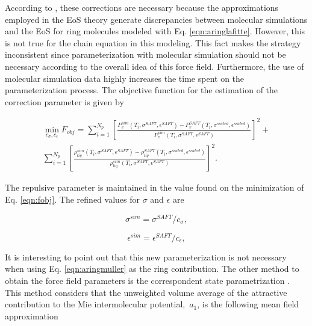 	According to , these corrections are necessary because the approximations employed in the EoS theory generate discrepancies between molecular simulations and the EoS for ring molecules modeled with Eq. \eqref{eqn:aringlafitte}. However, this is not true for the chain equation in this modeling. This fact makes the strategy inconsistent since parameterization with molecular simulation should not be necessary according to the overall idea of this force field. Furthermore, the use of molecular simulation data highly increases the time spent on the parameterization process. The objective function for the estimation of the correction parameter is given by
	
	\begin{equation}
	\begin{split}
	\min\limits_{c_{\sigma},c_{\epsilon}} F_{obj}= \sum_{i=1}^{N_{p}} \left[\frac{P_{v}^{sim}(T_{i},\sigma^{SAFT},\epsilon^{SAFT})-P_{v}^{SAFT}(T_{i},\sigma^{scaled},\epsilon^{scaled})}{P_{v}^{sim}(T_{i},\sigma^{SAFT},\epsilon^{SAFT})} \right]^2 + \\
	\sum_{i=1}^{N_{p}} \left[\frac{\rho_{liq}^{sim}(T_{i},\sigma^{SAFT},\epsilon^{SAFT})-\rho_{liq}^{SAFT}(T_{i},\sigma^{scaled},\epsilon^{scaled})}{\rho_{liq}^{sim}(T_{i},\sigma^{SAFT},\epsilon^{SAFT})} \right]^2 .
	\end{split}
	\label{eqn:fobjla}
	\end{equation}
	
	The repulsive parameter is maintained in the value found on the minimization of Eq. \eqref{eqn:fobj}. The refined values for $\sigma$ and $\epsilon$ are
	
	\begin{equation}
	\sigma^{sim} = \sigma^{SAFT}/c_{\sigma},
	\label{eqn:simsigma}
	\end{equation}
	
	\begin{equation}
	\epsilon^{sim} = \epsilon^{SAFT}/c_{\epsilon},
	\label{eqn:simeps}
	\end{equation}
	
	It is interesting to point out that this new parameterization is not necessary when using Eq. \eqref{eqn:aringmuller} as the ring contribution. The other method to obtain the force field parameters is the correspondent state parametrization \cite{mejia2014}. This method considers that the unweighted volume average of the attractive contribution to the Mie intermolecular potential, $ \, a_{1}$, is the following mean field approximation
	
